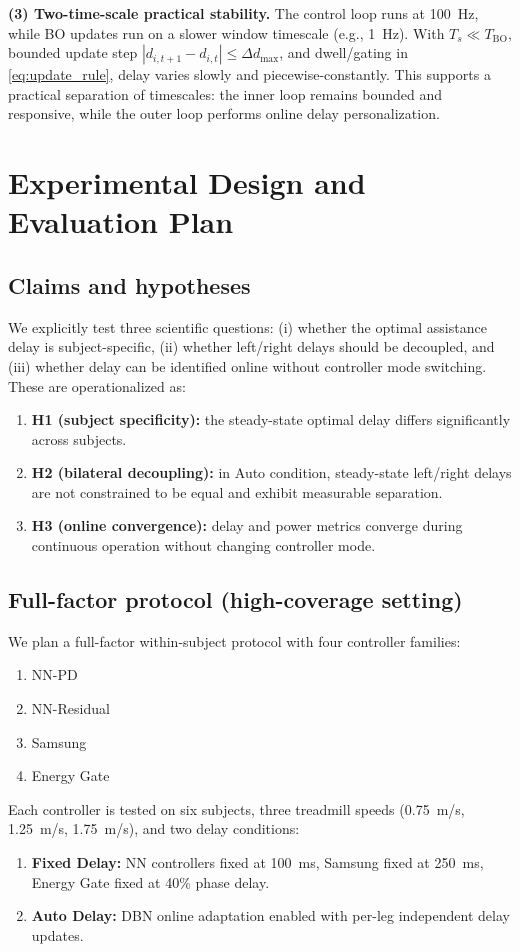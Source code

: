 \documentclass[lettersize,journal]{IEEEtran}
\begin{document}
\textbf{(3) Two-time-scale practical stability.}
The control loop runs at \SI{100}{Hz}, while BO updates run on a slower
window timescale (e.g., \SI{1}{Hz}).
With $T_s\ll T_{\mathrm{BO}}$, bounded update step
$|d_{i,t+1}-d_{i,t}|\le\Delta d_{\max}$, and dwell/gating in
\eqref{eq:update_rule}, delay varies slowly and piecewise-constantly.
This supports a practical separation of timescales: the inner loop
remains bounded and responsive, while the outer loop performs online
delay personalization.

\section{Experimental Design and Evaluation Plan}
\subsection{Claims and hypotheses}
We explicitly test three scientific questions: (i) whether the optimal assistance delay is subject-specific, (ii) whether left/right delays should be decoupled, and (iii) whether delay can be identified online without controller mode switching. These are operationalized as:
\begin{enumerate}
\item \textbf{H1 (subject specificity):} the steady-state optimal delay differs significantly across subjects.
\item \textbf{H2 (bilateral decoupling):} in Auto condition, steady-state left/right delays are not constrained to be equal and exhibit measurable separation.
\item \textbf{H3 (online convergence):} delay and power metrics converge during continuous operation without changing controller mode.
\end{enumerate}

\subsection{Full-factor protocol (high-coverage setting)}
We plan a full-factor within-subject protocol with four controller families:
\begin{enumerate}
\item NN-PD
\item NN-Residual
\item Samsung
\item Energy Gate
\end{enumerate}
Each controller is tested on six subjects, three treadmill speeds (\SI{0.75}{m/s}, \SI{1.25}{m/s}, \SI{1.75}{m/s}), and two delay conditions:
\begin{enumerate}
\item \textbf{Fixed Delay:} NN controllers fixed at \SI{100}{ms}, Samsung fixed at \SI{250}{ms}, Energy Gate fixed at 40\% phase delay.
\item \textbf{Auto Delay:} DBN online adaptation enabled with per-leg independent delay updates.
\end{enumerate}
\end{document}

